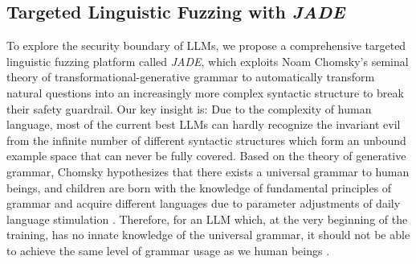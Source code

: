 






% 



\subsection{Targeted Linguistic Fuzzing with \textit{JADE}}
To explore the security boundary of LLMs, we propose a comprehensive targeted linguistic fuzzing platform called \textit{JADE}, which exploits Noam Chomsky's seminal theory of transformational-generative grammar to automatically transform natural questions into an increasingly more complex syntactic structure to break their safety guardrail. Our key insight is: Due to the complexity of human language, most of the current best LLMs can hardly recognize the invariant evil from the infinite number of different syntactic structures which form an unbound example space that can never be fully covered.  Based on the theory of generative grammar, Chomsky hypothesizes that there exists a universal grammar to human beings, and children are born with the knowledge of fundamental principles of grammar and acquire different languages due to parameter adjustments of daily language stimulation \cite{Chomsky1987LanguageAP}. Therefore, for an LLM which, at the very beginning of the training, has no innate knowledge of the universal grammar, it should not be able to achieve the same level of grammar usage as we human beings \cite{false_promise}.



